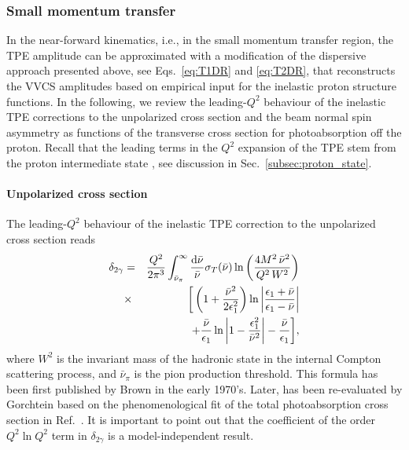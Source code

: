 \subsubsection{Small momentum transfer}\label{SmallMT}

In the near-forward kinematics, i.e., in the small momentum transfer region, the TPE amplitude can be approximated with a modification of the dispersive approach presented above, see Eqs.~\ref{eq:T1DR} and \ref{eq:T2DR}, that reconstructs the VVCS amplitudes based on empirical input for the inelastic proton structure functions. In the following, we review the leading-$Q^2$ behaviour of the inelastic TPE corrections to the unpolarized cross section and the beam normal spin asymmetry as functions of the transverse cross section for photoabsorption off the proton. Recall that the leading terms in the $Q^2$ expansion of the TPE stem from the proton intermediate state \cite{McKinley:1948zz,Brown:1970te}, see discussion in Sec.~\ref{subsec:proton_state}.

\paragraph{Unpolarized cross section}

The leading-$Q^2$ behaviour of the inelastic TPE correction to the unpolarized cross section reads \cite{Brown:1970te,Gorchtein:2014hla}
\begin{eqnarray}
\delta_{2\gamma}&=&\frac{Q^2}{2\pi^3}\int_{\bar\nu_\pi}^\infty \frac{\dd \bar \nu}{\bar \nu}\sigma_T (\bar \nu) \ln \left(\frac{4 M^2\,\bar \nu^2}{Q^2\,W^2}\right)\eqlab{delta2galowt} \nonumber\\
&\times&\bigg[\left(1+\frac{\bar \nu^2}{2\epsilon_1^2}\right)\ln \left\vert \frac{\epsilon_1+\bar \nu}{\epsilon_1-\bar \nu} \right\vert\nonumber\\&&+\frac{\bar \nu}{\epsilon_1}\ln \left\vert 1-\frac{\epsilon_1^2}{\bar \nu^2} \right\vert-\frac{\bar \nu}{\epsilon_1}\bigg],
\end{eqnarray}
where $W^2$ is the invariant mass of the hadronic state in the internal Compton scattering process, and $\bar\nu_\pi$ is the pion production threshold. This formula has been first published by Brown \cite{Brown:1970te} in the early 1970's. Later,  has been re-evaluated by Gorchtein \cite{Gorchtein:2014hla} based on the phenomenological fit of the total photoabsorption cross section in Ref.~\cite{Gorchtein:2011xx}. It is important to point out that the coefficient of the order $Q^2 \ln Q^2$ term in $\delta_{2\gamma}$ is a model-independent result.

